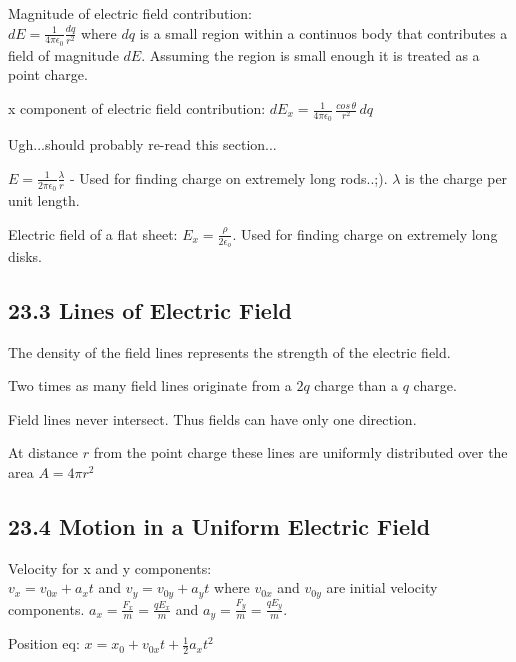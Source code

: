 \documentclass[twocolumn]{article}
\newenvironment{small_item}{
\begin{itemize}
  \setlength{\itemsep}{.25pt}
  \setlength{\parskip}{0pt}
  \setlength{\parsep}{0pt}
}{\end{itemize}}
\begin{document}
	\begin{small_item}
		\item Magnitude of electric field contribution: \\$dE = \frac{1}{4\pi\epsilon_0}\frac{dq}{r^2}$ where $dq$ is a small region within a continuos body that contributes a field of magnitude $dE$.  Assuming the region is small enough it is treated as a point charge.
		\item x component of electric field contribution: $dE_x = \frac{1}{4\pi\epsilon_0}\,\frac{cos\,\theta}{r^2}\,dq$
		\item Ugh...should probably re-read this section...
		\item $E = \frac{1}{2\pi\epsilon_0}\frac{\lambda}{r}$ - Used for finding charge on extremely long rods..;). $\lambda$ is the charge per unit length.
		\item Electric field of a flat sheet: $E_x = \frac{\rho}{2\epsilon_o}$.  Used for finding charge on extremely long disks.
	\end{small_item}
	
	\subsection*{23.3 Lines of Electric Field} %
	\label{sub:23_3_lines_of_electric_field}
	
	\begin{small_item}
		\item The density of the field lines represents the strength of the electric field.
		\item Two times as many field lines originate from a $2q$ charge than a $q$ charge.
		\item Field lines never intersect.  Thus fields can have only one direction.
		\item At distance $r$ from the point charge these lines are uniformly distributed over the area $A = 4\pi r^2$
	\end{small_item}
	
	
	\subsection*{23.4 Motion in a Uniform Electric Field} %
	\label{sub:23_4_motion_in_a_uniform_electric_field}

	\begin{small_item}
		\item Velocity for x and y components:\\
		$v_x = v_{0x} + a_xt$ and $v_y = v_{0y} + a_yt$ where $v_{0x}$ and $v_{0y}$ are initial velocity components.  $a_x = \frac{F_x}{m} = \frac{qE_x}{m}$ and $a_y = \frac{F_y}{m} = \frac{qE_y}{m}$.
		\item Position eq: $x = x_0 + v_{0x}t + \frac{1}{2}a_xt^2$
	\end{small_item}	
	
\end{document}
